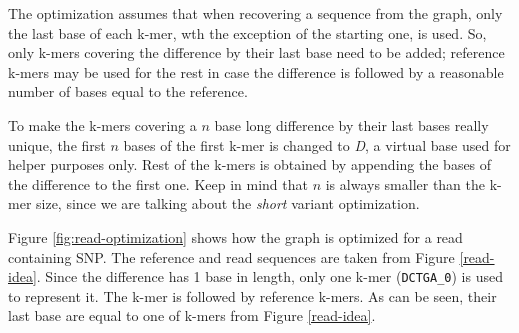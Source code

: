 The optimization assumes that when recovering a sequence from the graph, only the last base of each k-mer, wth the exception of the starting one, is used. So, only k-mers covering the difference by their last base need to be added; reference k-mers may be used for the rest in case the difference is followed by a reasonable number of bases equal to the reference. 

To make the k-mers covering a $n$ base long difference by their last bases really unique, the first $n$ bases of the first k-mer is changed to \textit{D}, a virtual base used for helper purposes only. Rest of the k-mers is obtained by appending the bases of the difference to the first one. Keep in mind that $n$ is always smaller than the k-mer size, since we are talking about the \textit{short} variant optimization.

Figure \ref{fig:read-optimization} shows how the graph is optimized for a read containing SNP. The reference and read sequences are taken from Figure \ref{read-idea}. Since the difference has 1 base in length, only one k-mer (\texttt{DCTGA\_0}) is used to represent it. The k-mer is followed by reference k-mers. As can be seen, their last base are equal to one of k-mers from Figure \ref{read-idea}.

